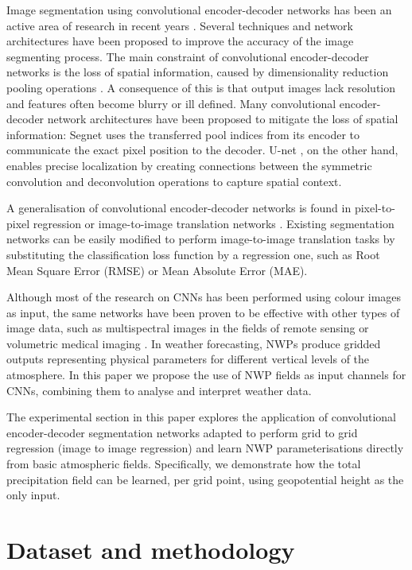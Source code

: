 \documentclass[twocol]{ametsoc}
\begin{document}
Image segmentation using convolutional encoder-decoder networks has been an active area of research in recent years \citep{krizhevsky2012imagenet,chen2018deeplab}. Several techniques and network architectures have been proposed to improve the accuracy of the image segmenting process. The main constraint of convolutional encoder-decoder networks is the loss of spatial information, caused by dimensionality reduction pooling operations \citep{scherer2010evaluation}. A consequence of this is that output images lack resolution and features often become blurry or ill defined. Many convolutional encoder-decoder network architectures have been proposed to mitigate the loss of spatial information: Segnet \citep{badrinarayanan2017segnet} uses the transferred pool indices from its encoder to communicate the exact pixel position to the decoder. U-net \citep{ronneberger2015u}, on the other hand, enables precise localization by creating connections between the symmetric convolution and deconvolution operations to capture spatial context.

A generalisation of convolutional encoder-decoder networks is found in pixel-to-pixel regression or image-to-image translation networks \citep{isola2017image}. Existing segmentation networks can be easily modified to perform image-to-image translation tasks by substituting the classification loss function by a regression one, such as Root Mean Square Error (RMSE) or Mean Absolute Error (MAE).

Although most of the research on CNNs has been performed using colour images as input, the same networks have been proven to be effective with other types of image data, such as multispectral images in the fields of remote sensing \citep{hu2015transferring} or volumetric medical imaging \citep{milletari2016v}. In weather forecasting, NWPs produce gridded outputs representing physical parameters for different vertical levels of the atmosphere. In this paper we propose the use of NWP fields as input channels for CNNs, combining them to analyse and interpret weather data.

The experimental section in this paper explores the application of convolutional encoder-decoder segmentation networks adapted to perform grid to grid regression (image to image regression) and learn NWP parameterisations directly from basic atmospheric fields. Specifically, we demonstrate how the total precipitation field can be learned, per grid point, using geopotential height as the only input.

\section{Dataset and methodology}
\end{document}

